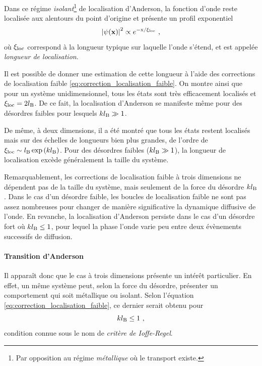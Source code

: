 Dans ce régime \emph{isolant}\footnote{Par opposition au régime \emph{métallique} où le transport existe.} de localisation d'Anderson, la fonction d'onde reste localisée aux alentours du point d'origine et présente un profil exponentiel
\begin{equation}
\left| \psi (\mathbf{x}) \right|^2 \propto e^{-\mathrm{x}/\xi_{\mathrm{loc}}} \text{ ,}
\end{equation}
où $\xi_{\mathrm{loc}}$ correspond à la longueur typique sur laquelle l'onde s'étend, et est appelée \emph{longueur de localisation}.

Il est possible de donner une estimation de cette longueur à l'aide des corrections de localisation faible \ref{eq:correction_localisation_faible}. On montre ainsi que pour un système unidimensionnel, tous les états sont très efficacement localisés et $\xi_{\mathrm{loc}}=2 l_{\mathrm{B}}$. De ce fait, la localisation d'Anderson se manifeste même pour des désordres faibles pour lesquels $kl_{\mathrm{B}} \gg 1$. 

De même, à deux dimensions, il a été montré que tous les états restent localisés mais sur des échelles de longueurs bien plus grandes, de l'ordre de $\xi_{\mathrm{loc}} \sim l_{\mathrm{B}} \exp{(k l_{\mathrm{B}})}$. Pour des désordres faibles ($k l_{\mathrm{B}} \gg 1$), la longueur de localisation excède généralement la taille du système. 

Remarquablement, les corrections de localisation faible à trois dimensions ne dépendent pas de la taille du système, mais seulement de la force du désordre $k l_{\mathrm{B}}$. Dans le cas d'un désordre faible, les boucles de localisation faible ne sont pas assez nombreuses pour changer de manière significative la dynamique diffusive de l'onde. En revanche, la localisation d'Anderson persiste dans le cas d'un désordre fort où $k l_{\mathrm{B}} \leq 1$, pour lequel la phase l'onde varie peu entre deux évènements successifs de diffusion. 



\paragraph*{Transition d'Anderson}
Il apparaît donc que le cas à trois dimensions présente un intérêt particulier. En effet, un même système peut, selon la force du désordre, présenter un comportement qui soit métallique ou isolant. Selon l'équation \ref{eq:correction_localisation_faible}, ce dernier serait obtenu pour 
\begin{equation}
k l_{\mathrm{B}} \leq 1 \text{ ,}
\label{eq:ioffe_regel}
\end{equation}
condition connue sous le nom de \emph{critère de Ioffe-Regel}. 

